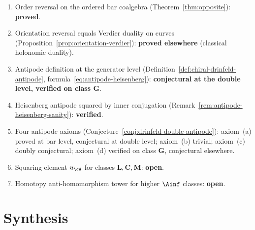 \begin{remark}
\label{rem:antipode-status}
\begin{enumerate}[label=(\roman*)]
\item Order reversal on the ordered bar coalgebra
(Theorem~\ref{thm:opposite}): \textbf{proved}.
\item Orientation reversal equals Verdier duality on curves
(Proposition~\ref{prop:orientation-verdier}): \textbf{proved
elsewhere} (classical holonomic duality).
\item Antipode definition at the generator level
(Definition~\ref{def:chiral-drinfeld-antipode},
formula~\eqref{eq:antipode-heisenberg}): \textbf{conjectural at
the double level, verified on class $\mathbf{G}$}.
\item Heisenberg antipode squared by inner conjugation
(Remark~\ref{rem:antipode-heisenberg-sanity}): \textbf{verified}.
\item Four antipode axioms
(Conjecture~\ref{conj:drinfeld-double-antipode}): axiom~(a)
proved at bar level, conjectural at double level; axiom~(b)
trivial; axiom~(c) doubly conjectural; axiom~(d) verified on
class $\mathbf{G}$, conjectural elsewhere.
\item Squaring element $u_\cA$ for classes
$\mathbf{L}, \mathbf{C}, \mathbf{M}$: \textbf{open}.
\item Homotopy anti-homomorphism tower for higher $\Ainf$ classes:
\textbf{open}.
\end{enumerate}
\end{remark}

\section{Synthesis}
\label{sec:sbf-supplement}

